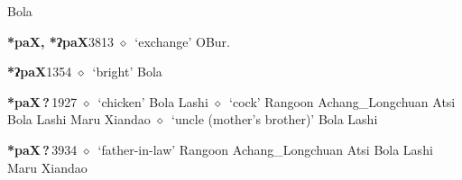\begin{list}{}{\leftmargin=1.5em \itemindent=-1.5em}
         Bola 
  \item {\footnotesize \textbf{*paX, *ʔpaX}}{\tiny 3813}
\hspace{1ex}
         $\diamond$~`exchange'
         OBur. 
  \item {\footnotesize \textbf{*ʔpaX}}{\tiny 1354}
\hspace{1ex}
         $\diamond$~`bright'
         Bola 
  \item {\footnotesize \textbf{*paX\,?\,}}{\tiny 1927}
\hspace{1ex}
         $\diamond$~`chicken'
         Bola 
\hspace{1ex}
         Lashi 
\hspace{1ex}
         $\diamond$~`cock'
         Rangoon 
\hspace{1ex}
         Achang\_Longchuan 
\hspace{1ex}
         Atsi 
\hspace{1ex}
         Bola 
\hspace{1ex}
         Lashi 
\hspace{1ex}
         Maru 
\hspace{1ex}
         Xiandao 
\hspace{1ex}
         $\diamond$~`uncle (mother's brother)'
         Bola 
\hspace{1ex}
         Lashi 
  \item {\footnotesize \textbf{*paX\,?\,}}{\tiny 3934}
\hspace{1ex}
         $\diamond$~`father-in-law'
         Rangoon 
\hspace{1ex}
         Achang\_Longchuan 
\hspace{1ex}
         Atsi 
\hspace{1ex}
         Bola 
\hspace{1ex}
         Lashi 
\hspace{1ex}
         Maru 
\hspace{1ex}
         Xiandao 
  \end{list}
